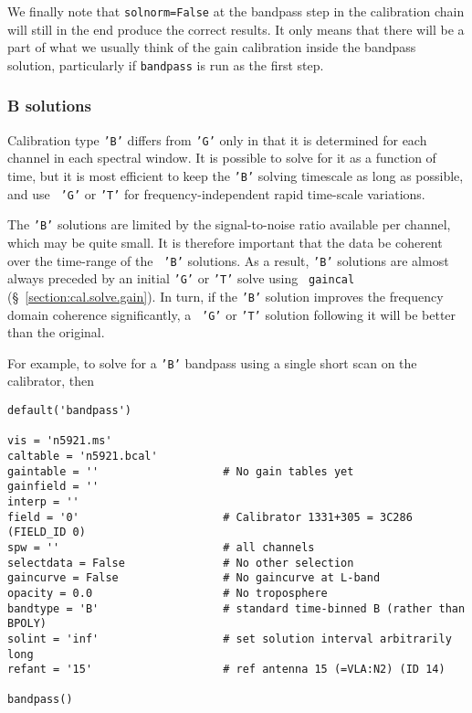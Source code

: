 We finally note that {\tt solnorm=False} at the bandpass step in the
calibration chain will still in the end produce the correct results.  It
only means that there will be a part of what we usually think of the
gain calibration inside the bandpass solution, particularly if
{\tt bandpass} is run as the first step.

\subsubsection{B solutions}
\label{section:cal.solve.band.b}

Calibration type {\tt 'B'} differs from {\tt 'G'} only in that it is
determined for each channel in each spectral window.  It is possible
to solve for it as a function of time, but it is most efficient to
keep the {\tt 'B'} solving timescale as long as possible, and use {\tt
'G'} or {\tt 'T'} for frequency-independent rapid  time-scale variations.

The {\tt 'B'} solutions are limited by the signal-to-noise ratio
available per channel, which may be quite small.  It is therefore
important that the data be coherent over the time-range of the {\tt
'B'} solutions.  As a result, {\tt 'B'} solutions are almost always
preceded by an initial {\tt 'G'} or {\tt 'T'} solve using {\tt
gaincal} (\S~\ref{section:cal.solve.gain}).  In turn, if the {\tt 'B'}
solution improves the frequency domain coherence significantly, a {\tt
'G'} or {\tt 'T'} solution following it will be better than the
original.

For example, to solve for a {\tt 'B'} bandpass using a single short
scan on the calibrator, then
\small
\begin{verbatim}
default('bandpass')

vis = 'n5921.ms'
caltable = 'n5921.bcal'
gaintable = ''                   # No gain tables yet
gainfield = ''
interp = ''
field = '0'                      # Calibrator 1331+305 = 3C286 (FIELD_ID 0)
spw = ''                         # all channels
selectdata = False               # No other selection
gaincurve = False                # No gaincurve at L-band
opacity = 0.0                    # No troposphere
bandtype = 'B'                   # standard time-binned B (rather than BPOLY)
solint = 'inf'                   # set solution interval arbitrarily long
refant = '15'                    # ref antenna 15 (=VLA:N2) (ID 14)

bandpass()
\end{verbatim}
\normalsize

